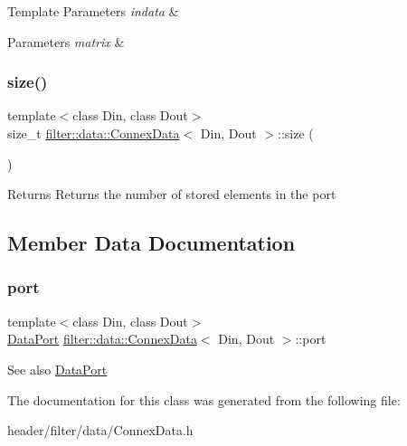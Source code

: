 \begin{DoxyTemplParams}{Template Parameters}
{\em indata} & \\
\hline
\end{DoxyTemplParams}

\begin{DoxyParams}{Parameters}
{\em matrix} & \\
\hline
\end{DoxyParams}
\mbox{\label{classfilter_1_1data_1_1_connex_data_aed293788ed40932ede5d3a30469f5cfd}} 
\subsubsection{\texorpdfstring{size()}{size()}}
{\footnotesize\ttfamily template$<$class Din, class Dout$>$ \\
size\+\_\+t \hyperlink{classfilter_1_1data_1_1_connex_data}{filter\+::data\+::\+Connex\+Data}$<$ Din, Dout $>$\+::size (\begin{DoxyParamCaption}{ }\end{DoxyParamCaption})\hspace{0.3cm}{\ttfamily [inline]}}

\begin{DoxyReturn}{Returns}
Returns the number of stored elements in the port 
\end{DoxyReturn}


\subsection{Member Data Documentation}
\mbox{\label{classfilter_1_1data_1_1_connex_data_a607857efe30c0053b56daf6a4da7c83f}} 
\subsubsection{\texorpdfstring{port}{port}}
{\footnotesize\ttfamily template$<$class Din, class Dout$>$ \\
\hyperlink{classfilter_1_1data_1_1_data_port}{Data\+Port} \hyperlink{classfilter_1_1data_1_1_connex_data}{filter\+::data\+::\+Connex\+Data}$<$ Din, Dout $>$\+::port}

\begin{DoxySeeAlso}{See also}
\hyperlink{classfilter_1_1data_1_1_data_port}{Data\+Port} 
\end{DoxySeeAlso}


The documentation for this class was generated from the following file\+:\begin{DoxyCompactItemize}
\item 
header/filter/data/Connex\+Data.\+h\end{DoxyCompactItemize}
